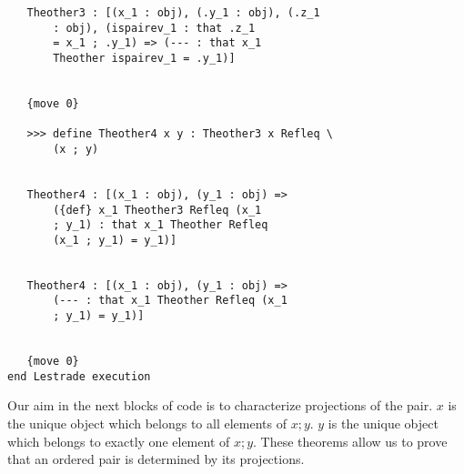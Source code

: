 \documentclass[12pt]{article}
\begin{document}
\begin{verbatim}
   Theother3 : [(x_1 : obj), (.y_1 : obj), (.z_1 
       : obj), (ispairev_1 : that .z_1 
       = x_1 ; .y_1) => (--- : that x_1 
       Theother ispairev_1 = .y_1)]


   {move 0}

   >>> define Theother4 x y : Theother3 x Refleq \
       (x ; y)


   Theother4 : [(x_1 : obj), (y_1 : obj) => 
       ({def} x_1 Theother3 Refleq (x_1 
       ; y_1) : that x_1 Theother Refleq 
       (x_1 ; y_1) = y_1)]


   Theother4 : [(x_1 : obj), (y_1 : obj) => 
       (--- : that x_1 Theother Refleq (x_1 
       ; y_1) = y_1)]


   {move 0}
end Lestrade execution
\end{verbatim}

Our aim in the next blocks of code is to characterize projections of the pair.  $x$ is the unique object which belongs to all elements of $x;y$.  $y$ is the unique object which belongs to exactly one element of $x;y$.  These theorems allow us to prove that an ordered pair is determined by its projections.
\end{document}

